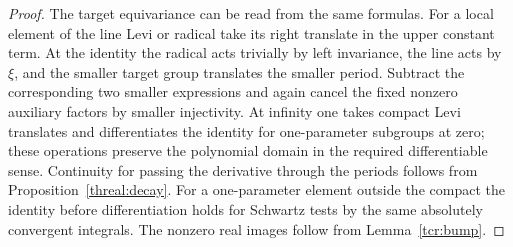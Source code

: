 \begin{proof}
The target equivariance can be read from the same formulas. For
a local element of the line Levi or radical take its right translate
in the upper constant term. At the identity the radical acts
trivially by left invariance, the line acts by \(\xi\), and the
smaller target group translates the smaller period. Subtract the
corresponding two smaller expressions and again cancel the fixed
nonzero auxiliary factors by smaller injectivity. At infinity
one takes compact Levi translates and differentiates the identity
for one-parameter subgroups at zero; these operations preserve the
polynomial domain in the required differentiable sense. Continuity
for passing the derivative through the periods follows from
Proposition~\ref{threal:decay}. For a one-parameter element outside
the compact the identity before differentiation holds for Schwartz
tests by the same absolutely convergent integrals. The nonzero
real images follow from Lemma~\ref{tcr:bump}.
\end{proof}

